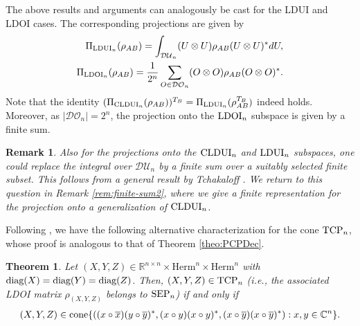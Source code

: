 \documentclass[11pt]{article}
\newcommand{\R}{\ensuremath{\mathbb{R}}}   %
\newcommand{\C}{\ensuremath{\mathbb{C}}} %
\newcommand{\MDU}{{\mathcal {DU}}}
\newcommand{\MDO}{{\mathcal {DO}}}
\newcommand{\Herm}{\mathrm{Herm}}
\newcommand{\TCP}{\text{\rm TCP}}
\newcommand{\SEP}{\text{\rm SEP}}
\newcommand{\CP}{\text{\rm CP}}
\newcommand{\CLDUI}{\text{\rm CLDUI}}
\newcommand{\LDUI}{\text{\rm LDUI}}
\newcommand{\LDOI}{\text{\rm LDOI}}
\newcommand{\cone}{\text{\rm cone}}
\newcommand{\diag}{\text{\rm diag}}
\newcommand{\ot}{\otimes}
\newcommand{\ovy}{\overline y}
\theoremstyle{plain}
\newtheorem{theorem}[satz]{Theorem}
\newtheorem{remark}[satz]{Remark}
\newcommand{\ML}{\textcolor{blue}}
\begin{document}
\medskip
The above results and arguments can analogously be cast for the LDUI and   LDOI cases. The corresponding projections are given by
\begin{align}
    \Pi_{\LDUI_n}(\rho_{AB})=\int_{\MDU_n}(U\ot U)\rho_{AB}(U\ot U)^*dU,\label{eq:PiLDUI}\\
    \Pi_{\LDOI_n}(\rho_{AB})=\frac{1}{2^n}\sum_{O\in\MDO_n}(O\ot O)\rho_{AB}(O\ot O)^*.\label{eq:PiLDOI}
\end{align}
Note that the identity  $(\Pi_{\CLDUI_n}(\rho_{AB}))^{T_B}=\Pi_{\LDUI_n}(\rho_{AB}^{T_B})$ indeed holds. Moreover, as $|\MDO_n|=2^n$, the projection onto the $\LDOI_n$ subspace is given by a finite sum.  

\begin{remark}\label{rem:finite-sum}
Also for  the projections onto the $\CLDUI_n$ and $\LDUI_n$ subspaces, one could replace the integral over $\MDU_n$ by a finite sum over a suitably selected finite subset. This follows from a general result by Tchakaloff \cite{Tchakaloff}. We return to this question in Remark \ref{rem:finite-sum2}, where we give a finite representation for the projection onto a generalization of $\CLDUI_n$. 
\end{remark}

Following \cite{SN-CLDUI}, we have the following alternative characterization  for the cone $\TCP_n$, whose proof is analogous to that of Theorem \ref{theo:PCPDec}.%

\begin{theorem}\label{theo:TCPDec}\cite{SN-CLDUI}
    Let $(X,Y,Z)\in\R^{n\times n}\times \Herm^n\times \Herm^n$ with $\diag(X)=\diag(Y)=\diag(Z)$. Then, $(X,Y,Z)\in\TCP_n$ (i.e., the associated LDOI matrix $\rho_{(X,Y,Z)}$ belongs to $\SEP_n$) if and only if 
    \begin{align}\label{eq:TCPDec}
        (X,Y,Z)\in\cone\{((x\circ \overline{x})(y\circ \overline{y})^*,(x\circ y)(x\circ y)^*,(x\circ \ovy)(x\circ \ovy)^*):x,y\in\C^n\}.
    \end{align}
\end{theorem}


\end{document}
